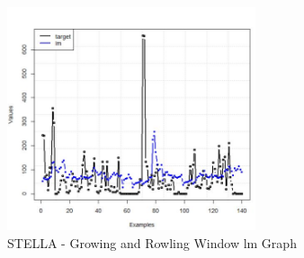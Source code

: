 \begin{figure}[H]
    \centering
    \includegraphics[width=0.65\textwidth]{assets/stella GW.jpeg}
    \caption{STELLA - Growing and Rowling Window lm Graph}
    \label{fig:gw_stella}
    \end{figure}
    